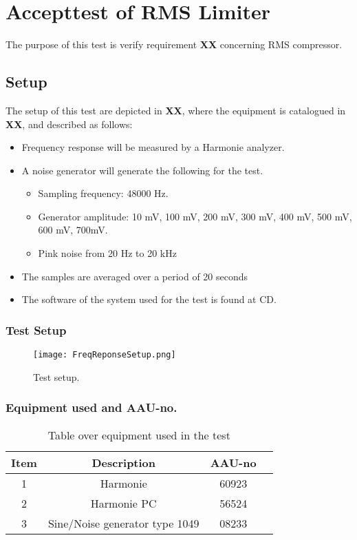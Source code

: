 \chapter{Accepttest of RMS Limiter}\label{app:journal_Frequency_Response2}
The purpose of this test is verify requirement \textbf{XX} concerning RMS compressor.

\section{Setup}
The setup of this test are depicted in \textbf{XX}, where the equipment is catalogued in \textbf{XX}, and described as follows:

\begin{itemize}
	\item Frequency response will be measured by a Harmonie analyzer.
	\item A noise generator will generate the following for the test. 
	\begin{itemize}
		\item Sampling frequency: 48000 Hz.
		\item Generator amplitude: 10 mV, 100 mV, 200 mV, 300 mV, 400 mV, 500 mV, 600 mV, 700mV.
		\item Pink noise from 20 Hz to 20 kHz
	\end{itemize}
	\item The samples are averaged over a period of 20 seconds
	\item The software of the system used for the test is found at CD. 
\end{itemize}


\subsection*{Test Setup}
\begin{figure}[H]
\centering
\texttt{[image: FreqReponseSetup.png]}
\label{fig:AcceptFreqResponse}
\caption{Test setup.}
\end{figure}

\subsection*{Equipment used and AAU-no.}

\begin{table}[H]
\centering
{}
\begin{tabular}{S[table-format=1]ccc} \toprule
    {Item} & {Description} & {AAU-no} \\       &  Harmonie  & 60923  \\ 
    2      &  Harmonie PC  & 56524  \\ 
    3      &  Sine/Noise generator type 1049  & 08233  \\  \bottomrule 
\end{tabular}
\caption{Table over equipment used in the test}
\label{tab:UsedEquipmentFreqResponse}
\end{table}
\vspace{-5mm}


